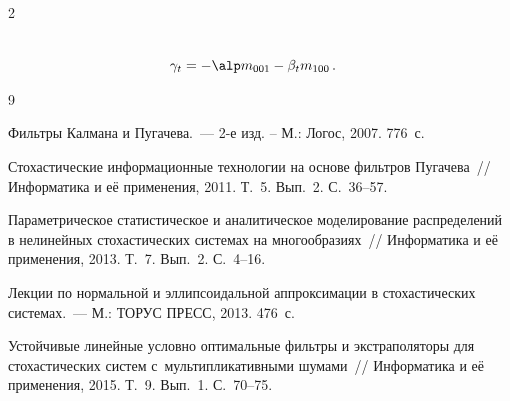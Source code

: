\begin{multicols}{2}
{\begin{align*}
    \\

    \gamma_t&=-\alp m_{001}-\beta_t m_{100}\,.


    \end{align*}



}







{\small\frenchspacing

 {%


 \begin{thebibliography}{9}





Фильтры Калмана и Пугачева.~--- 2-е изд. -- М.: Логос, 2007. 776~с.







 Стохастические информационные технологии на основе фильтров Пугачева~// Информатика и её применения, 2011. Т.~5. Вып.~2. С.~36--57.




  Параметрическое статистическое и аналитическое моделирование распределений в нелинейных стохастических системах на многообразиях~// Информатика и её применения, 2013. Т.~7. Вып.~2. С.~4--16.








 Лекции по нормальной и эллипсоидальной аппроксимации в стохастических системах.~--- М.: ТОРУС ПРЕСС, 2013. 476~с.





Устойчивые линейные условно оптимальные фильтры и экстраполяторы для стохастических систем с~мультипликативными шумами~// Информатика и её применения, 2015. Т.~9. Вып.~1. С.~70--75.




\end{thebibliography}}}
\end{multicols}
